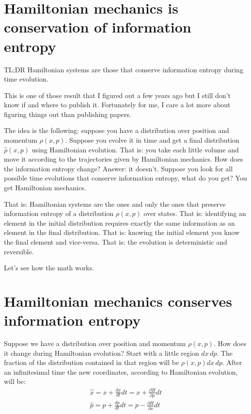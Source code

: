 \documentclass[aps,pra,10pt,floatfix,nofootinbib]{revtex4-1}
\theoremstyle{definition}
\begin{document}
	
\section{Hamiltonian mechanics is conservation of information entropy}

TL;DR Hamiltonian systems are those that conserve information entropy during time evolution.

This is one of those result that I figured out a few years ago but I still don't know if and where to publish it. Fortunately for me, I care a lot more about figuring things out than publishing papers.

The idea is the following: suppose you have a distribution over position and momentum $\rho(x, p)$. Suppose you evolve it in time and get a final distribution $\hat{\rho}(x, p)$ using Hamiltonian evolution. That is: you take each little volume and move it according to the trajectories given by Hamiltonian mechanics. How does the information entropy change? Answer: it doesn't. Suppose you look for all possible time evolutions that conserve information entropy, what do you get? You get Hamiltonian mechanics.

That is: Hamiltonian systems are the ones and only the ones that preserve information entropy of a distribution $\rho(x, p)$ over states. That is: identifying an element in the initial distribution requires exactly the same information as an element in the final distribution. That is: knowing the initial element you know the final element and vice-versa. That is: the evolution is deterministic and reversible.

Let's see how the math works.

\section{Hamiltonian mechanics conserves information entropy}

Suppose we have a distribution over position and momentum $\rho(x, p)$. How does it change during Hamiltonian evolution? Start with a little region $dx \,dp$. The fraction of the distribution contained in that region will be $\rho(x, p) dx \,dp$. After an infinitesimal time the new coordinates, according to Hamiltonian evolution, will be:
\begin{equation}
\begin{aligned}
\hat{x} = x + \frac{dx}{dt} dt = x + \frac{\partial H}{\partial p} dt  \\
\hat{p} = p + \frac{dp}{dt} dt = p - \frac{\partial H}{\partial x} dt  \\
\end{aligned}
\label{newCoordinates}
\end{equation}
\end{document}

